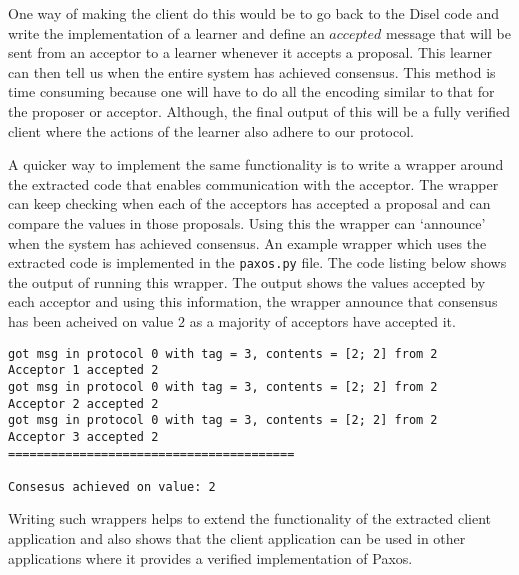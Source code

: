 One way of making the client do this would be to go back to the Disel code and
write the implementation of a learner and define an $accepted$ message that will
be sent from an acceptor to a learner whenever it accepts a proposal. This learner
can then tell us when the entire system has achieved consensus. This method is
time consuming because one will have to do all the encoding similar to that for
the proposer or acceptor. Although, the final output of this will be a fully
verified client where the actions of the learner also adhere to our protocol.

A quicker way to implement the same functionality is to write a
wrapper around the extracted code that enables communication with the
acceptor. The wrapper can keep checking when each of the acceptors has accepted
a proposal and can compare the values in those proposals. Using this the wrapper
can `announce' when the system has achieved consensus. An example wrapper which
uses the extracted code is implemented in the \texttt{paxos.py} file. The code
listing below shows the output of running this wrapper. The output shows
the values accepted by each acceptor and using this information, the wrapper
announce that consensus has been acheived on value $2$ as a majority of
acceptors have accepted it.

\begin{lstlisting}
got msg in protocol 0 with tag = 3, contents = [2; 2] from 2
Acceptor 1 accepted 2
got msg in protocol 0 with tag = 3, contents = [2; 2] from 2
Acceptor 2 accepted 2
got msg in protocol 0 with tag = 3, contents = [2; 2] from 2
Acceptor 3 accepted 2
========================================

Consesus achieved on value: 2
\end{lstlisting}


Writing such wrappers helps to extend the functionality of the extracted
client application and also shows that the client application can be used in
other applications where it provides a verified implementation of Paxos.


